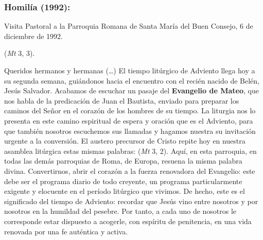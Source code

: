 \subsubsection{Homilía (1992):}

Visita Pastoral a la Parroquia Romana de Santa María del Buen Consejo, 6 de diciembre de 1992.

\begin{body}
	 (\emph{Mt} 3, 3).
	
	Queridos hermanos y hermanas (\ldots{}) El tiempo litúrgico de Adviento llega hoy a su segunda semana, guiándonos hacia el encuentro con el recién nacido de Belén, Jesús Salvador. Acabamos de escuchar un pasaje del \textbf{Evangelio de Mateo}, que nos habla de la predicación de Juan el Bautista, enviado para preparar los caminos del Señor en el corazón de los hombres de su tiempo. La liturgia nos lo presenta en este camino espiritual de espera y oración que es el Adviento, para que también nosotros escuchemos sus llamadas y hagamos nuestra su invitación urgente a la conversión. El austero precursor de Cristo repite hoy en nuestra asamblea litúrgica estas mismas palabras:  (\emph{Mt} 3, 2). Aquí, en esta parroquia, en todas las demás parroquias de Roma, de Europa, resuena la misma palabra divina. Convertirnos, abrir el corazón a la fuerza renovadora del Evangelio: este debe ser el programa diario de todo creyente, un programa particularmente exigente y elocuente en el período litúrgico que vivimos. De hecho, este es el significado del tiempo de Adviento: recordar que Jesús vino entre nosotros y por nosotros en la humildad del pesebre. Por tanto, a cada uno de nosotros le corresponde estar dispuesto a acogerle, con espíritu de penitencia, en una vida renovada por una fe auténtica y activa.
	

\end{body}
